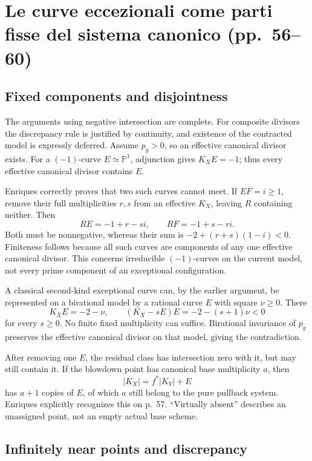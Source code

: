 \section[Curve eccezionali e sistema canonico]{Le curve eccezionali come parti fisse del sistema canonico (pp.~56--60)}\label{commentary-II-7}

\subsection{Fixed components and disjointness}

The arguments using negative intersection are complete. For composite divisors the discrepancy rule is justified by continuity, and existence of the contracted model is expressly deferred. Assume \(p_g>0\), so an effective canonical divisor exists. For a \((-1)\)-curve \(E\simeq\mathbb{P}^1\), adjunction gives \(K_X E=-1\); thus every effective canonical divisor contains \(E\).

Enriques correctly proves that two such curves cannot meet. If \(EF=i\ge1\), remove their full multiplicities \(r,s\) from an effective \(K_X\), leaving \(R\) containing neither. Then \[
RE=-1+r-si,\qquad RF=-1+s-ri.
\] Both must be nonnegative, whereas their sum is \(-2+(r+s)(1-i)<0\). Finiteness follows because all such curves are components of any one effective canonical divisor. This concerns irreducible \((-1)\)-curves on the current model, not every prime component of an exceptional configuration.

A classical second-kind exceptional curve can, by the earlier argument, be represented on a birational model by a rational curve \(E\) with square \(\nu\ge0\). There \[
K_X E=-2-\nu,\qquad (K_X-sE)E=-2-(s+1)\nu<0
\] for every \(s\ge0\). No finite fixed multiplicity can suffice. Birational invariance of \(p_g\) preserves the effective canonical divisor on that model, giving the contradiction.

After removing one \(E\), the residual class has intersection zero with it, but may still contain it. If the blowdown point has canonical base multiplicity \(a\), then \[
|K_X|=f^*|K_Y|+E
\] has \(a+1\) copies of \(E\), of which \(a\) still belong to the pure pullback system. Enriques explicitly recognizes this on p.~57. ``Virtually absent'' describes an unassigned point, not an empty actual base scheme.

\subsection{Infinitely near points and discrepancy}

